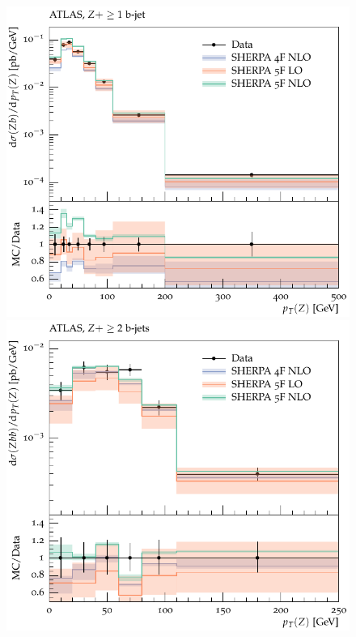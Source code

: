 \documentclass[11pt]{cernrep} \usepackage{graphicx,epsfig} 
\begin{document}
\begin{figure}[htbp]
   \includegraphics[scale=0.5]{figs/zbb/d15-x01-y01.pdf} 
   \includegraphics[scale=0.5]{figs/zbb/d25-x01-y01.pdf} 
\end{figure}
\end{document}
